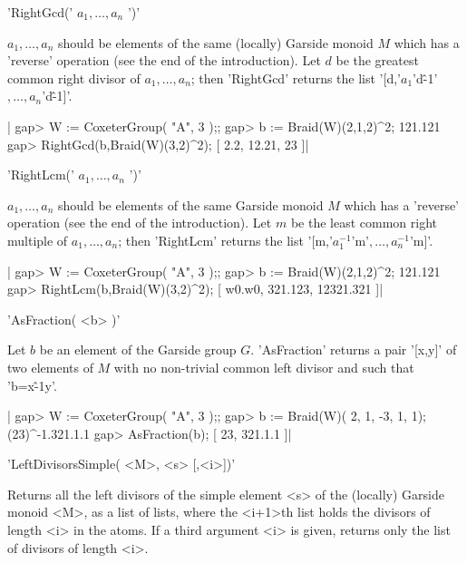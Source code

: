 

'RightGcd(' $a_1,\ldots,a_n$ ')'

$a_1,\ldots,a_n$ should be elements  of the same (locally) Garside monoid $M$
which has a  'reverse' operation (see the end of  the introduction). Let
$d$ be the greatest common right divisor of $a_1,\ldots,a_n$; then 'RightGcd'
returns the list '[d,'$a_1$'\*d\^-1'$,\ldots,a_n$'\*d\^-1]'.

|    gap>  W := CoxeterGroup( "A", 3 );;
    gap>  b := Braid(W)(2,1,2)^2;
    121.121
    gap> RightGcd(b,Braid(W)(3,2)^2);
    [ 2.2, 12.21, 23 ]|


'RightLcm(' $a_1,\ldots,a_n$ ')'

$a_1,\ldots,a_n$  should be elements  of the same  Garside monoid $M$ which
has a 'reverse' operation (see the end of the introduction). Let $m$ be the
least  common right  multiple of  $a_1,\ldots,a_n$; then 'RightLcm' returns
the list '[m,'$a_1^{-1}$'\*m'$,\ldots,a_n^{-1}$'\*m]'.

|    gap>  W := CoxeterGroup( "A", 3 );;
    gap>  b := Braid(W)(2,1,2)^2;
    121.121
    gap> RightLcm(b,Braid(W)(3,2)^2);
    [ w0.w0, 321.123, 12321.321 ]|


'AsFraction( <b> )'

Let $b$ be  an element of the Garside group  $G$. 'AsFraction' returns a
pair '[x,y]'  of two  elements of  $M$ with  no non-trivial  common left
divisor and such that 'b=x\^-1\*y'.

|    gap>  W := CoxeterGroup( "A", 3 );;
    gap>  b := Braid(W)( 2, 1, -3, 1, 1);
    (23)^-1.321.1.1
    gap> AsFraction(b);
    [ 23, 321.1.1 ]|


'LeftDivisorsSimple( <M>, <s> [,<i>])'

Returns  all the left divisors  of the simple element  <s> of the (locally)
Garside  monoid <M>, as a  list of lists, where  the <i+1>th list holds the
divisors  of length  <i> in  the atoms.  If a  third argument <i> is given,
returns only the list of divisors of length <i>.

